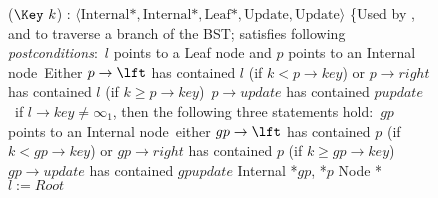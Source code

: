 \begin{figure*}
	\scriptsize
	\begin{code}
		\firstline
		($\Key\ k$) : $\langle \mbox{Internal*}, \mbox{Internal*}, \mbox{Leaf*}, \mbox{Update}, \mbox{Update}\rangle$  \{\ul
		\n \com Used by ,  and  to traverse a branch of the BST; satisfies following {\it postconditions}:\ul
		\com \postnotnull\ $l$ points to a Leaf node and $p$ points to an Internal node\ul
		\com \postl\ Either $p\rightarrow \lft$ has contained $l$ (if $k<p\rightarrow key$) or $p\rightarrow right$ has contained $l$ (if $k\geq p\rightarrow key$)\ul
		\com \postpup\ $p\rightarrow update$ has contained $pupdate$\ul
		\com \postnonempty\ if $l\rightarrow key\neq \infty_1$, then the following three statements hold:\ul
		\com \hspace*{3mm}\postgpnotnull\ $gp$ points to an Internal node\ul
		\com \hspace*{3mm}\postp\ either $gp\rightarrow \lft$ has contained $p$ (if $k<gp\rightarrow key$) or $gp\rightarrow right$ has contained $p$ (if $k\geq gp\rightarrow key$)\ul
		\com \hspace*{3mm}\postgpup\ $gp\rightarrow update$ has contained $gpupdate$\nlc
		Internal *$gp$, *$p$\nlc
		Node *$l:= Root$  \label{restart-search}\nlc
		

\end{code}
\end{figure*}

